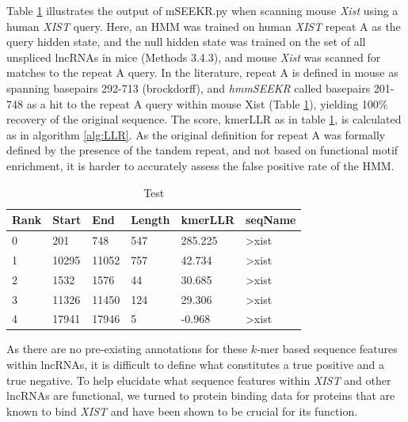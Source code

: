 Table \ref{tbl:hmmresults} illustrates the output of mSEEKR.py when scanning mouse \emph{Xist} using a human \emph{XIST} query. Here, an HMM was trained on human \emph{XIST} repeat A as the query hidden state, and the null hidden state was trained on the set of all unspliced lncRNAs in  mice (Methods 3.4.3), and mouse \emph{Xist} was scanned for matches to the repeat A query. In the literature, repeat A is defined in mouse as spanning basepairs 292-713 (brockdorff), and \emph{hmmSEEKR} called basepairs 201-748 as a hit to the repeat A query within mouse Xist (Table \ref{tbl:hmmresults}), yielding 100\% recovery of the original sequence. The score, kmerLLR as in table \ref{tbl:hmmresults}, is calculated as in algorithm \ref{alg:LLR}. As the original definition for repeat A was formally defined by the presence of the tandem repeat, and not based on functional motif enrichment, it is harder to accurately assess the false positive rate of the HMM.


\begin{table}[h]
\centering
\begin{tabular}{|l|l|l|l|l|l|}
\hline 
Rank&Start & End   & Length & kmerLLR & seqName                               \\
\hline 
0     & 201   & 748    & 547     & 285.225  & \textgreater{}xist \\
1     & 10295 & 11052  & 757     & 42.734   & \textgreater{}xist \\
2     & 1532  & 1576   & 44      & 30.685  & \textgreater{}xist \\
3     & 11326 & 11450  & 124     & 29.306   & \textgreater{}xist \\
4     & 17941 & 17946  & 5       & -0.968 & \textgreater{}xist\\
\hline 
\end{tabular}
\caption{Test}
\label{tbl:hmmresults}
\end{table}

As there are no pre-existing annotations for these $k$-mer based sequence features within lncRNAs, it is difficult to define what constitutes a true positive and a true negative. To help elucidate what sequence features within \emph{XIST} and other lncRNAs are functional, we turned to protein binding data for proteins that are known to bind \emph{XIST} and have been shown to be crucial for its function.

